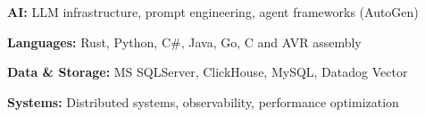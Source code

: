






\textbf{AI:} LLM infrastructure, prompt engineering, agent frameworks (AutoGen)

\medskip

\textbf{Languages:}  Rust, Python, C\#, Java, Go, C and AVR assembly

\medskip

\textbf{Data \& Storage:} MS SQLServer, ClickHouse, MySQL, Datadog Vector

\medskip

\textbf{Systems:} Distributed systems, observability, performance optimization

\bigskip
\bigskip











